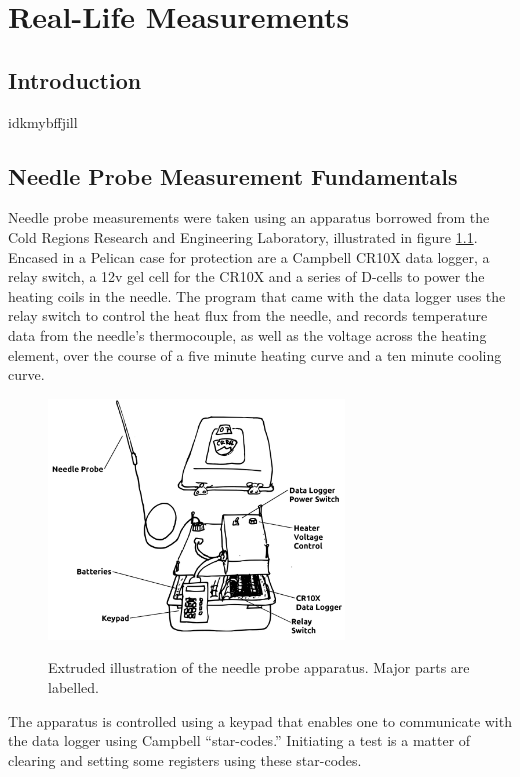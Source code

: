 \chapter{Real-Life Measurements}
\label{ch:irl}
\section{Introduction}

idkmybffjill

\section{Needle Probe Measurement Fundamentals}

Needle probe measurements were taken using an apparatus borrowed from the Cold
Regions Research and Engineering Laboratory, illustrated in figure
\ref{fig:apparatus}. Encased in a Pelican case for protection are a Campbell
CR10X data logger, a relay switch, a 12v gel cell for the CR10X and a series of
D-cells to power the heating coils in the needle. The program that came with the
data logger uses the relay switch to control the heat flux from the needle, and
records temperature data from the needle's thermocouple, as well as the voltage
across the heating element, over the course of a five minute heating curve and
a ten minute cooling curve.

\begin{figure}[h]
\centering
\includegraphics[width=0.7\textwidth]{fig/apparatus.png}
\label{fig:apparatus}
\caption{Extruded illustration of the needle probe apparatus. Major parts are labelled.}
\end{figure}

The apparatus is controlled using a keypad that enables one to communicate
with the data logger using Campbell ``star-codes.'' Initiating a test is a
matter of clearing and setting some registers using these star-codes.

